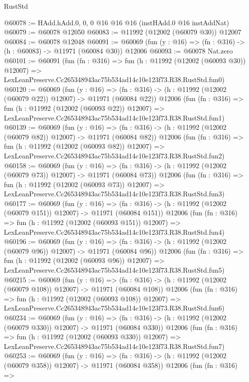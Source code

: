 \begin{lexlean}{RustStd}
\begin{coremodule}
@60078 := HAdd.hAdd.{0, 0, 0} @16 @16 @16 (instHAdd.{0} @16 instAddNat)
@60079 := @60078 @12050
@60083 := @11992 (@12002 (@60079 @30)) @12007
@60084 := @60078 @12048
@60091 := @60069 (fun (y : @16) => (fn : @316) -> (h : @60083) -> @11971 (@60084 @30)) @12006
@60093 := @60078 Nat.zero
@60101 := @60091
    (fun (fn : @316) =>
    fun (h : @11992 (@12002 (@60093 @30)) @12007) =>
    LexLeanPreserve.Cc265348943ac75b534ad14c10e123f73.R38.RustStd.fun0)
@60120 := @60069
    (fun (y : @16) =>
    (fn : @316) -> (h : @11992 (@12002 (@60079 @22)) @12007) -> @11971 (@60084 @22))
    @12006
    (fun (fn : @316) =>
    fun (h : @11992 (@12002 (@60093 @22)) @12007) =>
    LexLeanPreserve.Cc265348943ac75b534ad14c10e123f73.R38.RustStd.fun1)
@60139 := @60069
    (fun (y : @16) =>
    (fn : @316) -> (h : @11992 (@12002 (@60079 @82)) @12007) -> @11971 (@60084 @82))
    @12006
    (fun (fn : @316) =>
    fun (h : @11992 (@12002 (@60093 @82)) @12007) =>
    LexLeanPreserve.Cc265348943ac75b534ad14c10e123f73.R38.RustStd.fun2)
@60158 := @60069
    (fun (y : @16) =>
    (fn : @316) -> (h : @11992 (@12002 (@60079 @73)) @12007) -> @11971 (@60084 @73))
    @12006
    (fun (fn : @316) =>
    fun (h : @11992 (@12002 (@60093 @73)) @12007) =>
    LexLeanPreserve.Cc265348943ac75b534ad14c10e123f73.R38.RustStd.fun3)
@60177 := @60069
    (fun (y : @16) =>
    (fn : @316) -> (h : @11992 (@12002 (@60079 @151)) @12007) -> @11971 (@60084 @151))
    @12006
    (fun (fn : @316) =>
    fun (h : @11992 (@12002 (@60093 @151)) @12007) =>
    LexLeanPreserve.Cc265348943ac75b534ad14c10e123f73.R38.RustStd.fun4)
@60196 := @60069
    (fun (y : @16) =>
    (fn : @316) -> (h : @11992 (@12002 (@60079 @96)) @12007) -> @11971 (@60084 @96))
    @12006
    (fun (fn : @316) =>
    fun (h : @11992 (@12002 (@60093 @96)) @12007) =>
    LexLeanPreserve.Cc265348943ac75b534ad14c10e123f73.R38.RustStd.fun5)
@60215 := @60069
    (fun (y : @16) =>
    (fn : @316) -> (h : @11992 (@12002 (@60079 @108)) @12007) -> @11971 (@60084 @108))
    @12006
    (fun (fn : @316) =>
    fun (h : @11992 (@12002 (@60093 @108)) @12007) =>
    LexLeanPreserve.Cc265348943ac75b534ad14c10e123f73.R38.RustStd.fun6)
@60234 := @60069
    (fun (y : @16) =>
    (fn : @316) -> (h : @11992 (@12002 (@60079 @330)) @12007) -> @11971 (@60084 @330))
    @12006
    (fun (fn : @316) =>
    fun (h : @11992 (@12002 (@60093 @330)) @12007) =>
    LexLeanPreserve.Cc265348943ac75b534ad14c10e123f73.R38.RustStd.fun7)
@60253 := @60069
    (fun (y : @16) =>
    (fn : @316) -> (h : @11992 (@12002 (@60079 @358)) @12007) -> @11971 (@60084 @358))
    @12006
    (fun (fn : @316) =>

\end{coremodule}
\end{lexlean}
